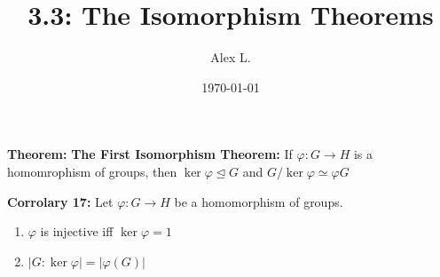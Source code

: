 \documentclass{article}
\title{3.3: The Isomorphism Theorems}
\author{Alex L.}
\date{\today}
\begin{document}
\maketitle

\textbf{Theorem:} \textbf{The First Isomorphism Theorem:} If $\varphi : G \rightarrow H$ is a homomrophism of groups, then $\ker \varphi \trianglelefteq G$ and $G/ \ker \varphi  \simeq \varphi G$

\textbf{Corrolary 17:} Let $\varphi : G \rightarrow H$ be a homomorphism of groups.
\begin{enumerate}
    \item $\varphi $ is injective iff $\ker \varphi = 1$
    \item $\vert G : \ker \varphi \vert = \vert \varphi (G) \vert$
\end{enumerate}  
\end{document}
